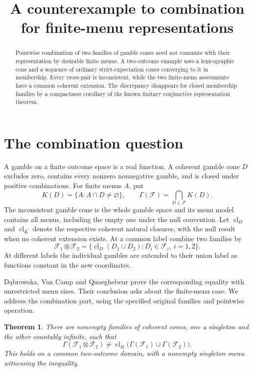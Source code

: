 \documentclass[11pt,a4paper]{amsart}
\title{A counterexample to combination for finite-menu representations}
\date{}
\newtheorem{theorem}{Theorem}
\begin{document}
\begin{abstract}
Pointwise combination of two families of gamble cones need not
commute with their representation by desirable finite menus.
A two-outcome example uses a lexicographic cone and a sequence of
ordinary strict-expectation cones converging to it in membership.
Every cross-pair is inconsistent, while the two finite-menu assessments
have a common coherent extension. The discrepancy disappears for
closed membership families by a compactness corollary of the known
finitary conjunctive representation theorem.
\end{abstract}
\maketitle

\section{The combination question}

A gamble on a finite outcome space is a real function. A coherent
gamble cone \(D\) excludes zero, contains every nonzero nonnegative
gamble, and is closed under positive combinations.
For finite menus \(A\), put
\[
 K(D)=\{A:A\cap D\ne\varnothing\},\qquad
 \Gamma(\mathcal F)=\bigcap_{D\in\mathcal F}K(D).
\]
The inconsistent gamble cone is the whole gamble space and its
menu model contains all menus, including the empty one under the
null convention. Let \(\operatorname{cl}_D\) and
\(\operatorname{cl}_K\) denote the respective coherent natural
closures, with the null result when no coherent extension exists.
At a common label combine two families by
\[
 \mathcal F_1\otimes\mathcal F_2
 =\{\operatorname{cl}_D(D_1\cup D_2):
                         D_i\in\mathcal F_i,\ i=1,2\}.
\]
At different labels the individual gambles are extended to
their union label as functions constant in the new coordinates.

D\k{a}browska, Van Camp and Quaeghebeur
\cite[Prop.~11, \S4]{smps} prove the corresponding equality
with unrestricted menu sizes. Their conclusion asks about the
finite-menu case. We address the combination part, using the
specified original families and pointwise operation.

\begin{theorem}
There are nonempty families of coherent cones, one a singleton
and the other countably infinite, such that
\[
 \Gamma(\mathcal F_1\otimes\mathcal F_2)
 \ne
 \operatorname{cl}_K\bigl(\Gamma(\mathcal F_1)\cup
                          \Gamma(\mathcal F_2)\bigr).
\]
This holds on a common two-outcome domain, with a nonempty
singleton menu witnessing the inequality.
\end{theorem}
\end{document}
